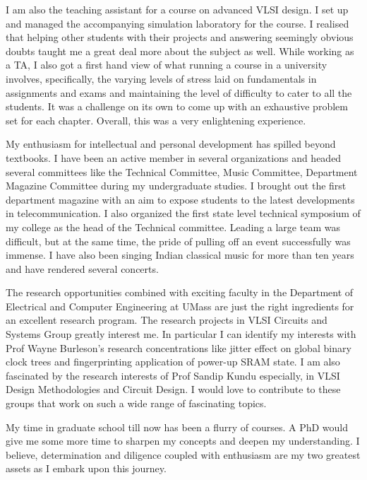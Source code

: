 \documentclass[letterpaper, 10pt]{article}
\begin{document}
I am also the teaching assistant for a course on advanced VLSI design. I set up and managed the accompanying simulation laboratory for the course. I realised that helping other students with their projects and answering seemingly obvious doubts taught me a great deal more about the subject as well. While working as a TA, I also got a first hand view of what running a course in a university involves, specifically,  the varying levels of stress laid on fundamentals in assignments and exams and maintaining the level of difficulty to cater to all the students. It was a challenge on its own to come up with an exhaustive problem set for each chapter. Overall, this was a very enlightening experience.

My enthusiasm for intellectual and personal development has spilled beyond textbooks. I have been an active member in several organizations and headed several committees like the Technical Committee, Music Committee, Department Magazine Committee during my undergraduate studies. I brought out the first department magazine with an aim to expose students to the latest developments in telecommunication. I also organized the first state level technical symposium of my college as the head of the Technical committee. Leading a large team was difficult, but at the same time, the pride of pulling off an event successfully was immense. I have also been singing Indian classical music for more than ten years and have rendered several concerts. 

 The research opportunities combined with exciting faculty in the Department of Electrical and Computer Engineering at UMass are just the right ingredients for an excellent research program. The research projects in VLSI Circuits and Systems Group greatly interest me. In particular I can identify my interests with Prof Wayne Burleson’s research concentrations like jitter effect on global binary clock trees and fingerprinting application of power-up SRAM state. I am also fascinated by the research interests of Prof Sandip Kundu especially, in VLSI Design Methodologies and Circuit Design. I would love to contribute to these groups that work on such a wide range of fascinating topics.

My time in graduate school till now has been a flurry of courses. A PhD would give me some more time to sharpen my concepts and deepen my understanding. I believe, determination and diligence coupled with enthusiasm are my two greatest assets as I embark upon this journey.
\end{document}
